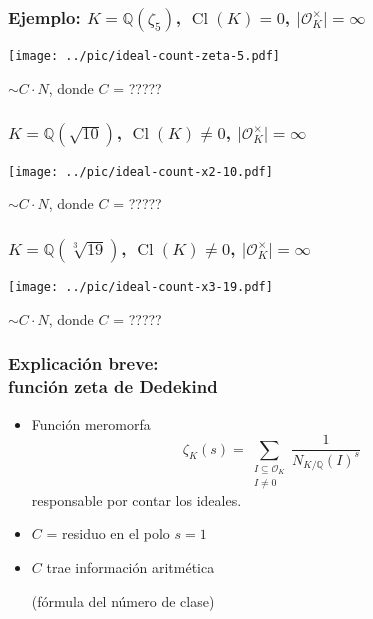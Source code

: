 \documentclass{beamer}
\newcommand{\QQ}{\mathbb{Q}}
\renewcommand{\O}{\mathcal{O}}
\DeclareMathOperator{\Cl}{Cl}
\begin{document}
\begin{frame}[fragile]
  \frametitle{Ejemplo: $K = \QQ (\zeta_5)$, $\Cl (K) = 0$, $|\O_K^\times| = \infty$}

  \begin{center}
    \texttt{[image: ../pic/ideal-count-zeta-5.pdf]}

    $\sim C\cdot N$, donde $C$ = ?????
  \end{center}
\end{frame}


\begin{frame}[fragile]
  \frametitle{$K = \QQ (\sqrt{10})$, $\Cl (K) \ne 0$, $|\O_K^\times| = \infty$}

  \begin{center}
    \texttt{[image: ../pic/ideal-count-x2-10.pdf]}

    $\sim C\cdot N$, donde $C$ = ?????
  \end{center}
\end{frame}


\begin{frame}[fragile]
  \frametitle{$K = \QQ (\sqrt[3]{19})$, $\Cl (K)\ne 0$, $|\O_K^\times| = \infty$}

  \begin{center}
    \texttt{[image: ../pic/ideal-count-x3-19.pdf]}

    $\sim C\cdot N$, donde $C$ = ?????
  \end{center}
\end{frame}


\begin{frame}[fragile]
  \frametitle{Explicación breve:\\
    función zeta de Dedekind}

  \begin{itemize}
  \item Función meromorfa
    $$\zeta_K (s) = \sum_{\substack{ I \subseteq \O_K \\ I \ne 0 }} \frac{1}{N_{K/\QQ} (I)^s}$$
    responsable por contar los ideales.

  \item $C$ = residuo en el polo $s = 1$

  \item $C$ trae información aritmética

    (fórmula del número de clase)
  \end{itemize}
\end{frame}
\end{document}
